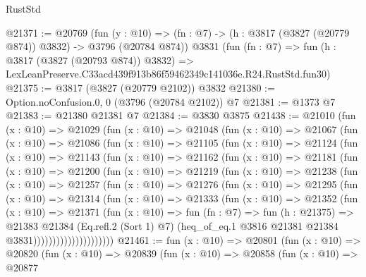 \begin{lexlean}{RustStd}
\begin{coremodule}
@21371 := @20769
    (fun (y : @10) => (fn : @7) -> (h : @3817 (@3827 (@20779 @874)) @3832) -> @3796 (@20784 @874))
    @3831
    (fun (fn : @7) =>
    fun (h : @3817 (@3827 (@20793 @874)) @3832) =>
    LexLeanPreserve.C33acd439f913b86f59462349c141036e.R24.RustStd.fun30)
@21375 := @3817 (@3827 (@20779 @2102)) @3832
@21380 := Option.noConfusion.{0, 0} (@3796 (@20784 @2102)) @7
@21381 := @1373 @7
@21383 := @21380 @21381 @7
@21384 := @3830 @3875
@21438 := @21010
    (fun (x : @10) =>
    @21029
      (fun (x : @10) =>
      @21048
        (fun (x : @10) =>
        @21067
          (fun (x : @10) =>
          @21086
            (fun (x : @10) =>
            @21105
              (fun (x : @10) =>
              @21124
                (fun (x : @10) =>
                @21143
                  (fun (x : @10) =>
                  @21162
                    (fun (x : @10) =>
                    @21181
                      (fun (x : @10) =>
                      @21200
                        (fun (x : @10) =>
                        @21219
                          (fun (x : @10) =>
                          @21238
                            (fun (x : @10) =>
                            @21257
                              (fun (x : @10) =>
                              @21276
                                (fun (x : @10) =>
                                @21295
                                  (fun (x : @10) =>
                                  @21314
                                    (fun (x : @10) =>
                                    @21333
                                      (fun (x : @10) =>
                                      @21352
                                        (fun (x : @10) =>
                                        @21371
                                          (fun (x : @10) =>
                                          fun (fn : @7) =>
                                          fun (h : @21375) =>
                                          @21383
                                            @21384
                                            (Eq.refl.{2} (Sort 1) @7)
                                            (heq_of_eq.{1}
                                              @3816
                                              @21381
                                              @21384
                                              @3831)))))))))))))))))))))
@21461 := fun (x : @10) =>
  @20801
    (fun (x : @10) =>
    @20820
      (fun (x : @10) =>
      @20839
        (fun (x : @10) =>
        @20858
          (fun (x : @10) =>
          @20877

\end{coremodule}
\end{lexlean}
